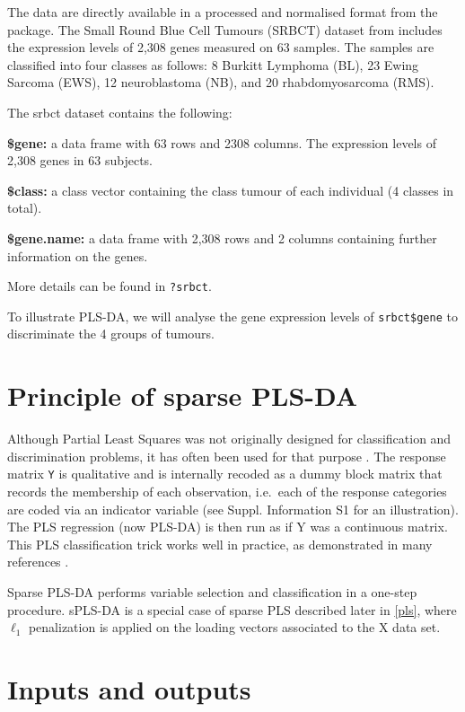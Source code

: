 \documentclass[]{book}
\begin{document}
The data are directly available in a processed and normalised format from the package. The Small Round Blue Cell Tumours (SRBCT) dataset from \citep{Kha01} includes the expression levels of 2,308 genes measured on 63 samples. The samples are classified into four classes as follows: 8 Burkitt Lymphoma (BL), 23 Ewing Sarcoma (EWS), 12 neuroblastoma (NB), and 20 rhabdomyosarcoma (RMS).

The srbct dataset contains the following:

\textbf{\$gene:} a data frame with 63 rows and 2308 columns. The expression levels of 2,308 genes in 63 subjects.

\textbf{\$class:} a class vector containing the class tumour of each individual (4 classes in total).

\textbf{\$gene.name:} a data frame with 2,308 rows and 2 columns containing further information on the genes.

More details can be found in \texttt{?srbct}.

To illustrate PLS-DA, we will analyse the gene expression levels of \texttt{srbct\$gene} to discriminate the 4 groups of tumours.

\hypertarget{principle-of-sparse-pls-da}{%
\section{Principle of sparse PLS-DA}\label{principle-of-sparse-pls-da}}

Although Partial Least Squares was not originally designed for classification and discrimination problems, it has often been used for that purpose \citep{Ngu02a, Tan04}. The response matrix \texttt{Y} is qualitative and is internally recoded as a dummy block matrix that records the membership of each observation, i.e.~each of the response categories are coded via an indicator variable (see \citep{mixomics} Suppl. Information S1 for an illustration). The PLS regression (now PLS-DA) is then run as if Y was a continuous matrix. This PLS classification trick works well in practice, as demonstrated in many references \citep{Bar03, Ngu02a, Bou07, Chung10}.

Sparse PLS-DA \citep{Lec11} performs variable selection and classification in a one-step procedure. sPLS-DA is a special case of sparse PLS described later in \ref{pls}, where \(\ell_1\) penalization is applied on the loading vectors associated to the X data set.

\hypertarget{inputs-and-outputs}{%
\section{Inputs and outputs}\label{inputs-and-outputs}}
\end{document}
